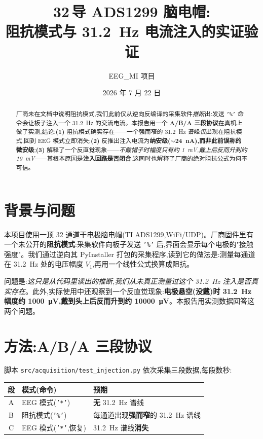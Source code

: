\documentclass[11pt]{ctexart}
\title{\bfseries 32\,导 ADS1299 脑电帽:\\阻抗模式与 \SI{31.2}{\hertz} 电流注入的实证验证}
\author{EEG\_MI 项目}
\date{2026 年 7 月 22 日}
\begin{document}
\maketitle

\begin{abstract}
\noindent
厂商未在文档中说明阻抗模式,我们此前仅从逆向反编译的采集软件\emph{推断}出:发送 \texttt{'\%'} 命令会让板子注入一个 \SI{31.2}{\hertz} 的交流电流。本报告用一个 \textbf{A/B/A 三段协议}在真机上做了实测,结论:\textbf{(1)} 阻抗模式确实存在——一个强而窄的 \SI{31.2}{\hertz} 谱峰\emph{仅}出现在阻抗模式,回到 EEG 模式立即消失;\textbf{(2)} 反推出注入电流为\textbf{纳安级($\sim$\SI{24}{\nano\ampere}),而非此前误称的微安级};\textbf{(3)} 解释了一个反直觉现象——\emph{不戴帽子时幅度只有约 \SI{1}{\milli\volt},戴上后反而升到约 \SI{10}{\milli\volt}}——其根本原因是\textbf{注入回路是否闭合},这同时也解释了厂商的绝对阻抗公式为何不可信。
\end{abstract}

\section{背景与问题}
本项目使用一顶 32 通道干电极脑电帽(TI ADS1299,WiFi/UDP)。厂商固件里有一个未公开的\textbf{阻抗模式}:采集软件向板子发送 \texttt{'\%'} 后,界面会显示每个电极的"接触强度"。我们通过逆向其 PyInstaller 打包的采集程序,读到它的做法是:测量每通道在 \SI{31.2}{\hertz} 处的电压幅度 $V_1$,再用一个线性公式换算成阻抗。

问题是:\emph{这只是从代码里读出的推断,我们从未真正测量过这个 \SI{31.2}{\hertz} 注入是否真实存在}。此外,实际使用中还观察到一个反直觉现象:\textbf{电极悬空(没戴)时 \SI{31.2}{\hertz} 幅度约 \SI{1000}{\micro\volt},戴到头上后反而升到约 \SI{10000}{\micro\volt}}。本报告用实测数据回答这两个问题。

\section{方法:A/B/A 三段协议}
脚本 \texttt{src/acquisition/test\_injection.py} 依次采集三段数据,每段数秒:
\begin{center}
\begin{tabular}{@{}cll@{}}
\toprule
段 & 模式(命令) & 预期 \\
\midrule
A & EEG 模式(\texttt{'*'}) & \textbf{无} \SI{31.2}{\hertz} 谱线 \\
B & 阻抗模式(\texttt{'\%'}) & 每通道出现\textbf{强而窄}的 \SI{31.2}{\hertz} 谱线 \\
C & EEG 模式(\texttt{'*'},恢复) & \SI{31.2}{\hertz} 谱线\textbf{消失} \\
\bottomrule
\end{tabular}
\end{center}
\end{document}
